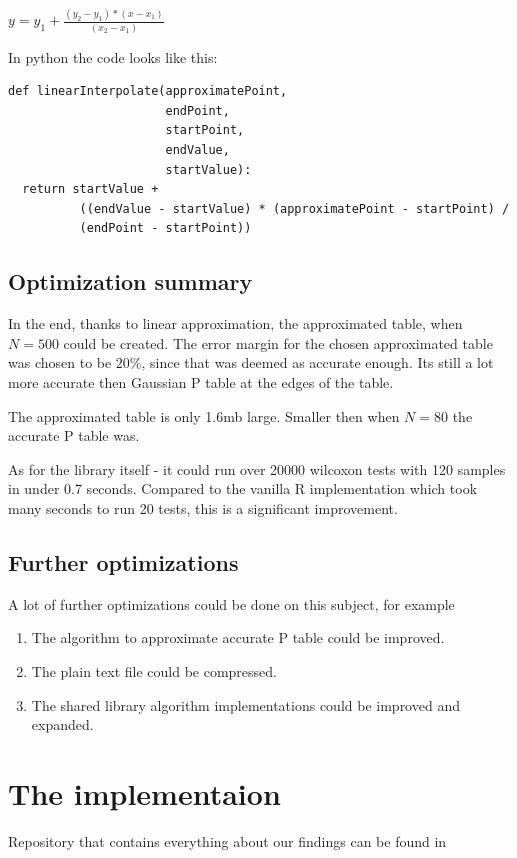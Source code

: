 \documentclass[12pt]{article}
\begin{document}
$y = y_1 + \frac{(y_2 - y_1) * (x - x_1)}{(x_2 - x_1)}$

In python the code looks like this:

\begin{verbatim}
def linearInterpolate(approximatePoint,
                      endPoint,
                      startPoint,
                      endValue,
                      startValue):
  return startValue +
          ((endValue - startValue) * (approximatePoint - startPoint) /
          (endPoint - startPoint))
\end{verbatim}

\subsection{Optimization summary}
In the end, thanks to linear approximation, the approximated table, when $N=500$ could be created. The error margin for the chosen approximated table was chosen to be $20\%$, since that was deemed as accurate enough. Its still a lot more accurate then Gaussian P table at the edges of the table.

The approximated table is only 1.6mb large. Smaller then when $N=80$ the accurate P table was.

As for the library itself - it could run over 20000 wilcoxon tests with 120 samples in under 0.7 seconds. Compared to the vanilla R implementation which took many seconds to run 20 tests, this is a significant improvement.

\subsection{Further optimizations}
A lot of further optimizations could be done on this subject, for example

\begin{enumerate}
\item The algorithm to approximate accurate P table could be improved.
\item The plain text file could be compressed.
\item The shared library algorithm implementations could be improved and expanded.
\end{enumerate}

\newpage

\section{The implementaion}
Repository that contains everything about our findings can be found in
\end{document}
